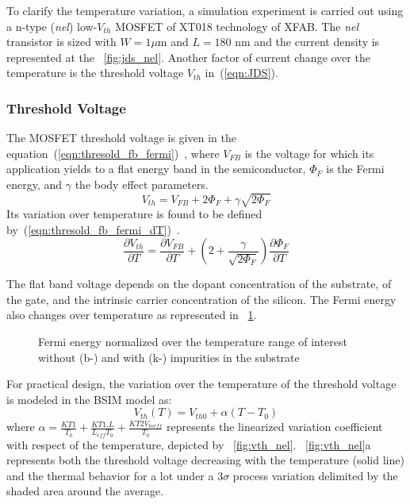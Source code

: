 To clarify the temperature variation, a simulation experiment is carried out using a n-type (\emph{nel}) low-\(V_{th}\) MOSFET of XT018 technology of XFAB\@. The \emph{nel} transistor is sized with \(W = 1 \mu \)m and \(L=180\) nm and the current density is represented at the \figurename~\ref{fig:jds_nel}. Another factor of current change over the temperature is the threshold voltage \(V_{th} \) in~(\ref{eqn:JDS}).

\subsubsection{Threshold Voltage}      %
\label{sec:threshold}
The MOSFET threshold voltage is given in the equation~(\ref{eqn:thresold_fb_fermi})~\cite{Sze2006}, where \(V_{FB} \) is the voltage for which its application yields to a flat energy band in the semiconductor, \(\Phi_F \) is the Fermi energy, and \(\gamma \) the body effect parameters.
\begin{equation}
\label{eqn:thresold_fb_fermi}
V_{th} = V_{FB} + 2 \Phi_F + \gamma \sqrt{2 \Phi_F}
\end{equation}
Its variation over temperature is found to be defined by~(\ref{eqn:thresold_fb_fermi_dT})~\cite{Filanovsky2001}.
\begin{equation}
\label{eqn:thresold_fb_fermi_dT}
\frac{\partial V_{th}}{\partial T} = \frac{\partial V_{FB}}{\partial T} + \left( 2  + \frac{\gamma}{\sqrt{2 \Phi_F}} \right) \frac{\partial \Phi_F}{\partial T}
\end{equation}

The flat band voltage depends on the dopant concentration of the substrate, of the gate, and the intrinsic carrier concentration of the silicon. The Fermi energy also changes over temperature as represented in \figurename~\ref{fig:electron_fermi_si}.

\begin{figure}[!ht]
	\centering
	\resizebox{0.5\textwidth}{!} {
		
	}
	\caption{Fermi energy normalized over the temperature range of interest without (b-) and with (k-) impurities in the substrate}
	\label{fig:electron_fermi_si}
\end{figure}

For practical design, the variation over the temperature of the threshold voltage is modeled in the BSIM model as:
\begin{equation}
V_{th}(T) = V_{th0} + \alpha (T - T_0)
\end{equation}
where \(\alpha = \frac{KT1}{T_0}+\frac{KT1.L}{L_{eff} T_0}+\frac{KT2 V_{bseff}}{T_0}\) represents the linearized variation coefficient with respect of the temperature, depicted by \figurename~\ref{fig:vth_nel}. \figurename~\ref{fig:vth_nel}a represents both the threshold voltage decreasing with the temperature (solid line) and the thermal behavior for a lot under a 3\(\sigma \) process variation delimited by the shaded area around the average.

